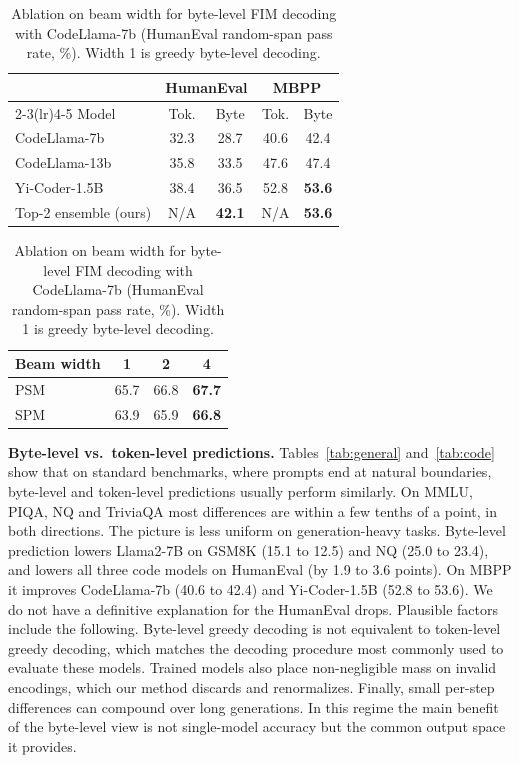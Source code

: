 \documentclass{article} %
\begin{document}
\begin{table}[t]
\begin{minipage}[t]{0.56\linewidth}
\caption{Pass@1 (\%) of code LMs with token-level (Tok.) and byte-level (Byte) predictions, and of our top-2 byte-level ensemble. Bold: best per benchmark.}
\label{tab:code}
\begin{center}
\setlength{\tabcolsep}{4pt}
\begin{tabular}{lcccc}
\toprule
& \multicolumn{2}{c}{HumanEval} & \multicolumn{2}{c}{MBPP} \\
\cmidrule(lr){2-3}\cmidrule(lr){4-5}
Model & Tok. & Byte & Tok. & Byte \\
\midrule
CodeLlama-7b & 32.3 & 28.7 & 40.6 & 42.4 \\
CodeLlama-13b & 35.8 & 33.5 & 47.6 & 47.4 \\
Yi-Coder-1.5B & 38.4 & 36.5 & 52.8 & \textbf{53.6} \\
\midrule
Top-2 ensemble (ours) & N/A & \textbf{42.1} & N/A & \textbf{53.6} \\
\bottomrule
\end{tabular}
\end{center}
\end{minipage}\hfill
\begin{minipage}[t]{0.40\linewidth}
\caption{Ablation on beam width for byte-level FIM decoding with CodeLlama-7b (HumanEval random-span pass rate, \%). Width 1 is greedy byte-level decoding.}
\label{tab:beam}
\begin{center}
\begin{tabular}{lccc}
\toprule
Beam width & 1 & 2 & 4 \\
\midrule
PSM & 65.7 & 66.8 & \textbf{67.7} \\
SPM & 63.9 & 65.9 & \textbf{66.8} \\
\bottomrule
\end{tabular}
\end{center}
\end{minipage}
\end{table}

\textbf{Byte-level vs.\ token-level predictions.} Tables~\ref{tab:general} and~\ref{tab:code} show that on standard benchmarks, where prompts end at natural boundaries, byte-level and token-level predictions usually perform similarly. On MMLU, PIQA, NQ and TriviaQA most differences are within a few tenths of a point, in both directions. The picture is less uniform on generation-heavy tasks. Byte-level prediction lowers Llama2-7B on GSM8K (15.1 to 12.5) and NQ (25.0 to 23.4), and lowers all three code models on HumanEval (by 1.9 to 3.6 points). On MBPP it improves CodeLlama-7b (40.6 to 42.4) and Yi-Coder-1.5B (52.8 to 53.6). We do not have a definitive explanation for the HumanEval drops. Plausible factors include the following. Byte-level greedy decoding is not equivalent to token-level greedy decoding, which matches the decoding procedure most commonly used to evaluate these models. Trained models also place non-negligible mass on invalid encodings, which our method discards and renormalizes. Finally, small per-step differences can compound over long generations. In this regime the main benefit of the byte-level view is not single-model accuracy but the common output space it provides.
\end{document}
